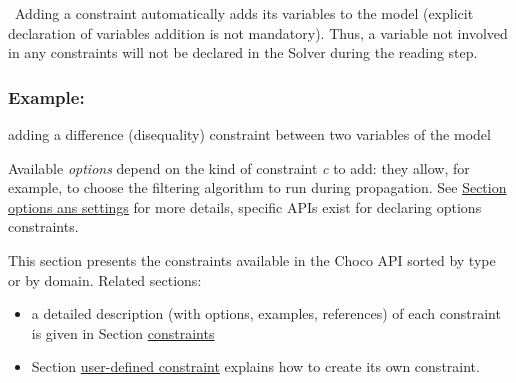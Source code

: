 

\begin{note}\
Adding a constraint automatically adds its variables to the model (explicit declaration of variables addition is not mandatory).
Thus, a variable not involved in any constraints will not be declared in the Solver during the reading step.
\end{note}


\subsubsection{Example:} adding a difference (disequality) constraint between two variables of the model



Available \emph{options} depend on the kind of constraint \emph{c} to add: they allow, for example, to choose the filtering algorithm to run during propagation. See \hyperlink{optionssettings}{Section options ans settings} for more details, specific APIs exist for declaring options constraints.

This section presents the constraints available in the Choco API sorted by type or by domain. Related sections:
\begin{itemize}
\item a detailed description (with options, examples, references) of each constraint is given in Section \hyperlink{ch:constraints}{constraints}
\item Section \hyperlink{advanced:defineyourownconstraint}{user-defined constraint} explains how to create its own constraint.
\end{itemize}


